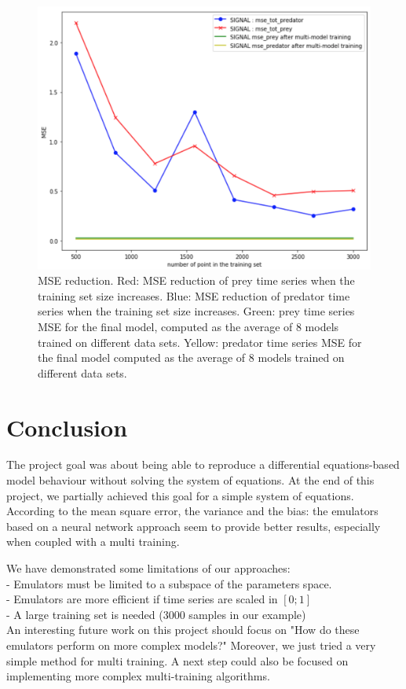 \documentclass{article}
\begin{document}
\begin{figure}[H]
\centering
\includegraphics[scale=0.5]{image/mse_reduction.png}
\caption{MSE reduction. Red: MSE reduction of prey time series when the training set size increases. Blue: MSE reduction of predator time series when the training set size increases.  Green: prey time series MSE for the final model, computed as the average of 8 models trained on different data sets. Yellow: predator time series MSE for the final model computed as the average of 8 models trained on different data sets.}
\label{fig: influance of multi model training on mse}
\end{figure}


\section{Conclusion}

The project goal was about being able to reproduce a differential equations-based model behaviour without solving the system of equations. At the end of this project, we partially achieved this goal for a simple system of equations. According to the mean square error, the variance and the bias: the emulators based on a neural network approach seem to provide better results, especially when coupled with a multi training. 

We have demonstrated some limitations of our approaches:\\
- Emulators must be limited to a subspace of the parameters space.
\\
- Emulators are more efficient if time series are scaled in $[0;1]$ 
\\
- A large training set is needed (3000 samples in our example)
\\
An interesting future work on this project should focus on "How do these emulators perform on more complex models?"  Moreover, we just tried a very simple method for multi training. A next step could also be focused on implementing more complex multi-training algorithms. 





\newpage


\end{document}
